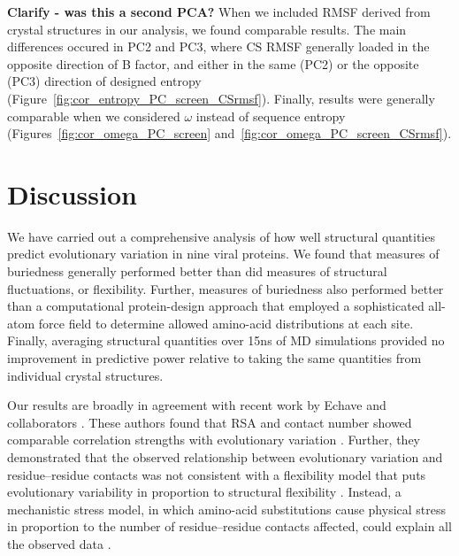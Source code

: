 \documentclass[smallextended]{svjour3}
\begin{document}
\textbf{Clarify - was this a second PCA?}
When we included RMSF derived from crystal structures in our analysis, we found comparable results. The main differences occured in PC2 and PC3, where CS RMSF generally loaded in the opposite direction of B factor, and either in the same (PC2) or the opposite (PC3) direction of designed entropy (Figure~\ref{fig:cor_entropy_PC_screen_CSrmsf}). Finally, results were generally comparable when we considered $\omega$ instead of sequence entropy (Figures~\ref{fig:cor_omega_PC_screen} and~\ref{fig:cor_omega_PC_screen_CSrmsf}).

\section*{Discussion}

We have carried out a comprehensive analysis of how well structural quantities predict evolutionary variation in nine viral proteins. We  found that measures of buriedness generally performed better than did measures of structural fluctuations, or flexibility. Further, measures of buriedness also performed better than a computational protein-design approach that employed a sophisticated all-atom force field to determine allowed amino-acid distributions at each site. Finally, averaging structural quantities over 15ns of MD simulations provided no improvement in predictive power relative to taking the same quantities from individual crystal structures. 

Our results are broadly in agreement with recent work by Echave and collaborators \citep{Yehetal2014,Huangetal2014}. These authors found that RSA and contact number showed comparable correlation strengths with evolutionary variation \citep{Yehetal2014}. Further, they demonstrated that the observed relationship between evolutionary variation and residue--residue contacts was not consistent with a flexibility model that puts evolutionary variability in proportion to structural flexibility \citep{Huangetal2014}. Instead, a mechanistic stress model, in which amino-acid substitutions cause physical stress in proportion to the number of residue--residue contacts affected, could explain all the observed data \citep{Huangetal2014}.
\end{document}

